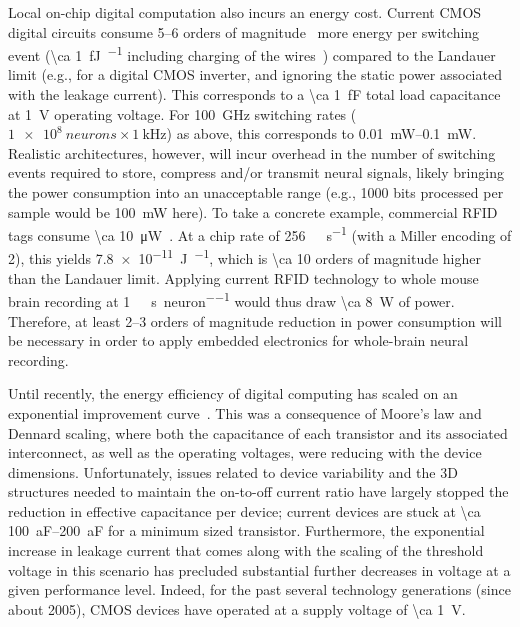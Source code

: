 Local on-chip digital computation also incurs an energy cost.
Current CMOS digital circuits consume 5--6 orders of magnitude~\cite{tucker11,koomey11,yablonovitch08,tucker11b} more energy per switching event (\SI{\ca 1}{\femto\joule\per\bit} including charging of the wires~\cite{tucker11}) compared to the Landauer limit (e.g., for a digital CMOS inverter, and ignoring the static power associated with the leakage current).
This corresponds to a \SI{\ca 1}{\femto\farad} total load capacitance at \SI{1}{\volt} operating voltage. For \SI{100}{\giga\hertz} switching rates ($\SI{1e8}{neurons} \times \SI{1}{\kilo\hertz}$) as above, this corresponds to \SIrange{0.01}{0.1}{\milli\watt}.
Realistic architectures, however, will incur overhead in the number of switching events required to store, compress and/or transmit neural signals, likely bringing the power consumption into an unacceptable range (e.g., \num{1000} bits processed per sample would be \SI{100}{\milli\watt} here).
To take a concrete example, commercial RFID tags consume \SI{\ca 10}{\micro\watt}~\cite{rfidsheet}.
At a chip rate of \SI{256}{\kilo\bit\per\second} (with a Miller encoding of 2), this yields \SI{7.8e-11}{\joule\per\bit}, which is \num{\ca 10} orders of magnitude higher than the Landauer limit.
Applying current RFID technology to whole mouse brain recording at \SI{1}{\kilo\bit\per\second\per neuron} would thus draw \SI{\ca 8}{\watt} of power.
Therefore, at least 2--3 orders of magnitude reduction in power consumption will be necessary in order to apply embedded electronics for whole-brain neural recording.

Until recently, the energy efficiency of digital computing has scaled on an exponential improvement curve~\cite{koomey11}.
This was a consequence of Moore's law and Dennard scaling, where both the capacitance of each transistor and its associated interconnect, as well as the operating voltages, were reducing with the device dimensions.
Unfortunately, issues related to device variability and the 3D structures needed to maintain the on-to-off current ratio have largely stopped the reduction in effective capacitance per device; current devices are stuck at \SIrange{\ca 100}{200}{\atto\farad} for a minimum sized transistor.
Furthermore, the exponential increase in leakage current that comes along with the scaling of the threshold voltage in this scenario has precluded substantial further decreases in voltage at a given performance level.
Indeed, for the past several technology generations (since about 2005), CMOS devices have operated at a supply voltage of \SI{\ca 1}{\volt}.

